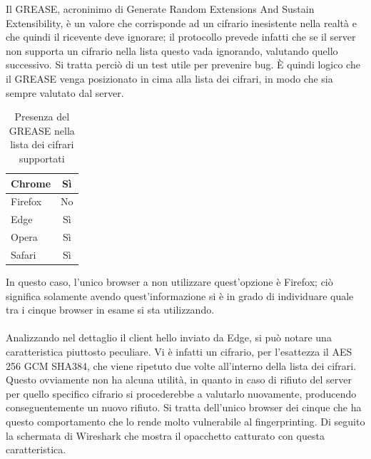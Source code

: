 Il GREASE,  acroninimo di Generate Random Extensions And Sustain Extensibility, è un valore che corrisponde ad un cifrario inesistente nella realtà e che quindi il ricevente deve ignorare; il protocollo prevede infatti che se il server non supporta un cifrario nella lista questo vada ignorando, valutando quello successivo. Si tratta perciò di un test utile per prevenire bug. \cite{GREASE}
È quindi logico che il GREASE venga posizionato in cima alla lista dei cifrari, in modo che sia sempre valutato dal server.
\\
\begin{table}[H]
	\centering
	\begin{tabular}{| l | c |}
			\hline
		\rowcolor[HTML]{FDD20A}Chrome & Sì
		\\
		\hline
		\rowcolor[HTML]{FF9500}Firefox & No
		\\
		\hline
		\rowcolor[HTML]{3277BC}Edge & Sì
		\\
		\hline
		\rowcolor[HTML]{CB0B1E}Opera & Sì
		\\
		\hline
		\rowcolor[HTML]{0FB5EE} Safari & Sì
		\\
		\hline
	\end{tabular}
	\caption{Presenza del GREASE nella lista dei cifrari supportati}
	\label{tab:grease}
\end{table}

In questo caso, l'unico browser a non utilizzare quest'opzione è Firefox; ciò significa solamente avendo quest'informazione si è in grado di individuare quale tra i cinque browser in esame si sta utilizzando.
\\ \\
Analizzando nel dettaglio il client hello inviato da Edge, si può notare una caratteristica piuttosto peculiare. Vi è infatti un cifrario, per l'esattezza il AES 256 GCM SHA384, che viene ripetuto due volte all'interno della lista dei cifrari. Questo ovviamente non ha alcuna utilità, in quanto in caso di rifiuto del server per quello specifico cifrario si procederebbe a valutarlo nuovamente, producendo conseguentemente un nuovo rifiuto. Si tratta dell'unico browser dei cinque che ha questo comportamento che lo rende molto vulnerabile al fingerprinting.
Di seguito la schermata di Wireshark che mostra il opacchetto catturato con questa caratteristica.

